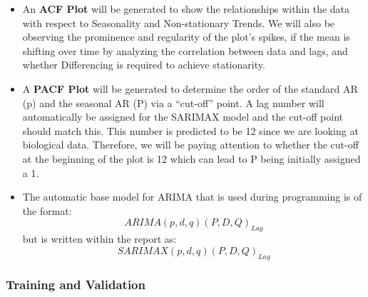 \documentclass[
  letterpaper,
  DIV=11,
  numbers=noendperiod]{scrartcl}
\begin{document}
\begin{itemize}
\begin{itemize}
    as few parameters as possible - too many parameters can diminish the
    model's optimization.
  \item
    \textbf{Step 3: Diagnostic Checking} involves investigating the
    residuals (the difference between the predicted SARIMAX values and
    observed data) to ensure no additional patterns are left in the
    error/residual terms; the residuals should resemble ``white noise''
    randomness. Next, the \textbf{Ljung-Box Test} is utilized to check
    to see if the residuals are as desired, i.e., random, followed by a
    mean and variance check; the desired outcome is that the residuals
    have a mean close to zero and a variance that is constant
    (homoskedasticity) confirming that the residuals do not grow or
    shrink over time. Also, the residuals are compared to the water
    temperature data to make sure that they do not correlate; if this is
    the case, its coefficient will have to be re-estimated. Finally, the
    term Iterative Refinement is used to describe the process for going
    back through the steps so far if the previous checks raised any
    issues.
  \end{itemize}
\item
  An \textbf{ACF Plot} will be generated to show the relationships
  within the data with respect to Seasonality and Non-stationary Trends.
  We will also be observing the prominence and regularity of the plot's
  spikes, if the mean is shifting over time by analyzing the correlation
  between data and lags, and whether Differencing is required to achieve
  stationarity.
\item
  A \textbf{PACF Plot} will be generated to determine the order of the
  standard AR (p) and the seasonal AR (P) via a ``cut-off'' point. A lag
  number will automatically be assigned for the SARIMAX model and the
  cut-off point should match this. This number is predicted to be 12
  since we are looking at biological data. Therefore, we will be paying
  attention to whether the cut-off at the beginning of the plot is 12
  which can lead to P being initially assigned a 1.
\item
  The automatic base model for ARIMA that is used during programming is
  of the format: \[ ARIMA(p,d,q)(P,D,Q)_{Lag}\] but is written within
  the report as: \[ SARIMAX(p,d,q)(P,D,Q)_{Lag}\]
\end{itemize}

\subsubsection{Training and Validation}\label{training-and-validation}
\end{document}
